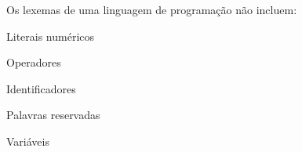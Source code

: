 \question[10]

Os lexemas de uma linguagem de programação não incluem:

\begin{choices}
\item Literais numéricos
\item Operadores
\item Identificadores
\item Palavras reservadas
\item Variáveis %
\end{choices}
\answerline

